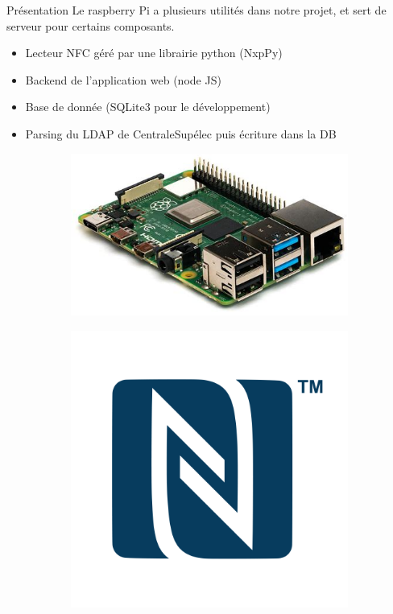 \documentclass[aspectratio=169]{beamer}
\begin{document}
\begin{frame}{Présentation}
  Le raspberry Pi a plusieurs utilités dans notre projet, et sert de serveur pour certains composants.
  \begin{itemize}
    \item Lecteur NFC géré par une librairie python (NxpPy)
    \item Backend de l'application web (node JS)
    \item Base de donnée (SQLite3 pour le développement)
    \item Parsing du LDAP de CentraleSupélec puis écriture dans la DB
  \end{itemize}

  \begin{figure}
    \begin{subfigure}{.2\textwidth}
      \centering
      \includegraphics[width=.8\linewidth]{../assets/raspi.jpeg}
    \end{subfigure}
    \begin{subfigure}{.2\textwidth}
      \centering
      \includegraphics[width=.8\linewidth]{../assets/nfc.png}

\end{subfigure}
\end{figure}
\end{frame}
\end{document}
